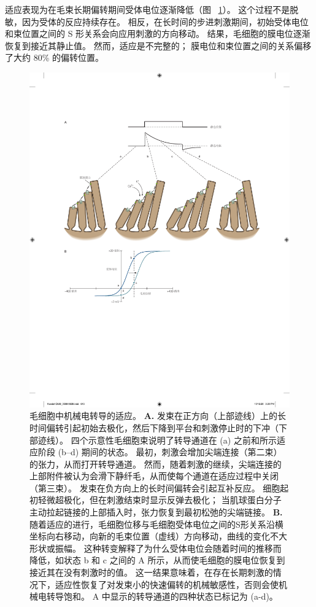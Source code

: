 适应表现为在毛束长期偏转期间受体电位逐渐降低（图 ~\ref{fig:26_12}）。
这个过程不是脱敏，因为受体的反应持续存在。
相反，在长时间的步进刺激期间，初始受体电位和束位置之间的 S 形关系会向应用刺激的方向移动。
结果，毛细胞的膜电位逐渐恢复到接近其静止值。
然而，适应是不完整的；
膜电位和束位置之间的关系偏移了大约 80\% 的偏转位置。


\begin{figure}[htbp]
	\centering
	\includegraphics[width=1.0\linewidth]{chap26/fig_26_12}
	\caption{毛细胞中机械电转导的适应。
		\textbf{A.} 发束在正方向（上部迹线）上的长时间偏转引起初始去极化，然后下降到平台和刺激停止时的下冲（下部迹线）。
		四个示意性毛细胞束说明了转导通道在 (a) 之前和所示适应阶段 (b–d) 期间的状态。
		最初，刺激会增加尖端连接（第二束）的张力，从而打开转导通道。 然而，随着刺激的继续，尖端连接的上部附件被认为会滑下静纤毛，从而使每个通道在适应过程中关闭（第三束）。
		发束在负方向上的长时间偏转会引起互补反应。
		细胞起初轻微超极化，但在刺激结束时显示反弹去极化；
		当肌球蛋白分子主动拉起链接的上部插入时，张力恢复到最初松弛的尖端链接。
		\textbf{B.} 随着适应的进行，毛细胞位移与毛细胞受体电位之间的S形关系沿横坐标向右移动，向新的毛束位置（虚线）方向移动，曲线的变化不大 形状或振幅。
		这种转变解释了为什么受体电位会随着时间的推移而降低，如状态 b 和 c 之间的 A 所示，从而使毛细胞的膜电位恢复到接近其在没有刺激时的值。
		这一结果意味着，在存在长期刺激的情况下，适应性恢复了对发束小的快速偏转的机械敏感性，否则会使机械电转导饱和。
		A 中显示的转导通道的四种状态已标记为 (a-d)\cite{hudspeth1994pulling}。}
	\label{fig:26_12}
\end{figure}


